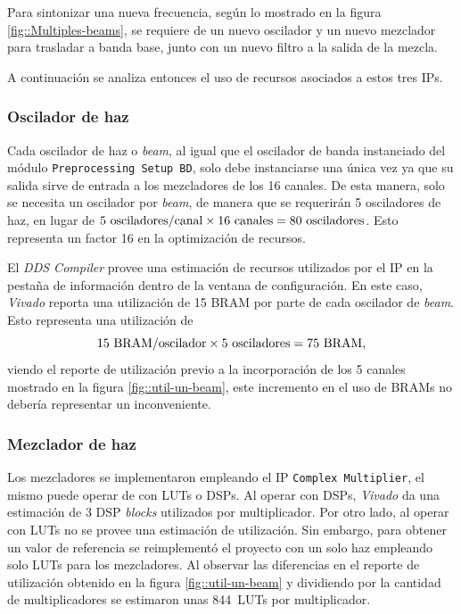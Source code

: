 \documentclass[../../main.tex]{subfiles}
\begin{document}
Para sintonizar una nueva frecuencia, según lo mostrado en la figura \ref{fig::Multiples-beams}, se requiere de un nuevo oscilador y un nuevo mezclador para trasladar a banda base, junto con un nuevo filtro a la salida de la mezcla. 

A continuación se analiza entonces el uso de recursos asociados a estos tres IPs.

\subsubsection{Oscilador de haz}
Cada oscilador de haz o \textit{beam}, al igual que el oscilador de banda instanciado del módulo \texttt{Preprocessing Setup BD}, solo debe instanciarse una única vez ya que su salida sirve de entrada a los mezcladores de los 16 canales. De esta manera, solo se necesita un oscilador por \textit{beam}, de manera que se requerirán 5 osciladores de haz, en lugar de $5~\textrm{osciladores/canal} \times 16~\textrm{canales} = 80~\textrm{osciladores}$. Esto representa un factor 16 en la optimización de recursos.

El \textit{DDS Compiler} provee una estimación de recursos utilizados por el IP en la pestaña de información dentro de la ventana de configuración. En este caso, \textit{Vivado} reporta una utilización de 15 BRAM por parte de cada oscilador de \textit{beam}. Esto representa una utilización de \[15~\textrm{BRAM/oscilador} \times 5~\textrm{osciladores} = 75~\textrm{BRAM},\] viendo el reporte de utilización previo a la incorporación de los 5 canales mostrado en la figura \ref{fig::util-un-beam}, este incremento en el uso de BRAMs no debería representar un inconveniente.

\subsubsection{Mezclador de haz}
Los mezcladores se implementaron empleando el IP \texttt{Complex Multiplier}, el mismo puede operar de con LUTs o DSPs. Al operar con DSPs, \textit{Vivado} da una estimación de 3 DSP \textit{blocks} utilizados por multiplicador. Por otro lado, al operar con LUTs no se provee una estimación de utilización. Sin embargo, para obtener un valor de referencia se reimplementó el proyecto con un solo haz empleando solo LUTs para los mezcladores. Al observar las diferencias en el reporte de utilización obtenido en la figura \ref{fig::util-un-beam} y dividiendo por la cantidad de multiplicadores se estimaron unas 844~LUTs por multiplicador.
\end{document}
